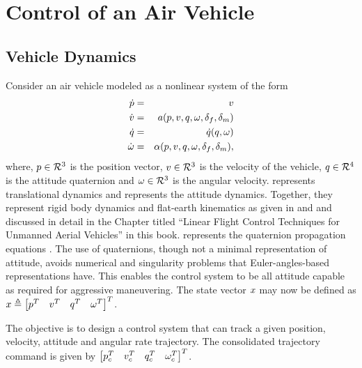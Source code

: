 \section{Control of an Air Vehicle}
\subsection{Vehicle Dynamics}
Consider an air vehicle modeled as a nonlinear system of the form
%
\begin{eqnarray}
\dot{p} &=& v                                     \label{e:pdot}    \\
\dot{v} &=& a(p,v,q,\omega,\delta_f, \delta_m)          \label{e:vdot}    \\
\dot{q} &=& \dot{q}(q,\omega)                         \label{e:quatdot} \\
\dot{\omega} &=& \alpha(p,v,q,\omega,\delta_f, \delta_m),
\label{e:omdot}
\end{eqnarray}
%
where, $p \in \mathcal{R}^{3}$ is the position vector, $v \in
\mathcal{R}^{3}$ is the velocity of the vehicle, $q \in \mathcal{R}^{4}$ is the
attitude quaternion and $\omega \in \mathcal{R}^{3}$ is the angular
velocity.  represents translational dynamics and
 represents the attitude dynamics. Together, they represent rigid body dynamics and flat-earth kinematics as given in \cite{etkin72} and \cite{stevens:book:2003} and {\color{red} discussed in detail in the Chapter titled ``Linear Flight Control Techniques for
Unmanned Aerial Vehicles'' in this book}. 
represents the quaternion propagation equations \cite{stevens:book:2003}.
The use of quaternions, though not a minimal representation of
attitude, avoids numerical and singularity problems that
Euler-angles-based representations have. This enables the control
system to be all attitude capable as required for aggressive
maneuvering. The state vector $x$ may now be defined as $ x
\triangleq
\begin{bmatrix} p^T & v^T &q^T &\omega^T\end{bmatrix}^T
$.

\begin{note}
The objective is to design a control system that can track a given position, velocity, attitude and angular rate trajectory. The consolidated trajectory command is given by
$\begin{bmatrix} p_c^T & v_c^T &q_c^T &\omega_c^T\end{bmatrix}^T$.
\end{note}


